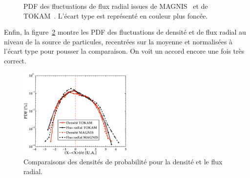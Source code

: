 \begin{refsection}
\begin{figure}[!htb]
  \centering
    \caption{PDF des fluctuations de
    flux radial issues de MAGNIS~ et de 
    TOKAM~. L'écart type est représenté en couleur plus
    foncée.}
    \label{4-TokamPdfFlux}
\end{figure}

Enfin, la figure~\ref{4-TokamPDFDensite} montre les PDF des fluctuations de densité
et de flux radial au niveau de la source de particules, recentrées
sur la moyenne et normalisées à l'écart type pour pousser la comparaison. On
voit un accord encore une fois très correct.

 \begin{figure}[!htbp]
\centering
\includegraphics[width=0.5\textwidth]{figures/4-TokamPDFDensite.eps}
{\caption{Comparaisons des densités de probabilité pour la densité et
le flux radial.}
\label{4-TokamPDFDensite}}
\end{figure}


\end{refsection}
